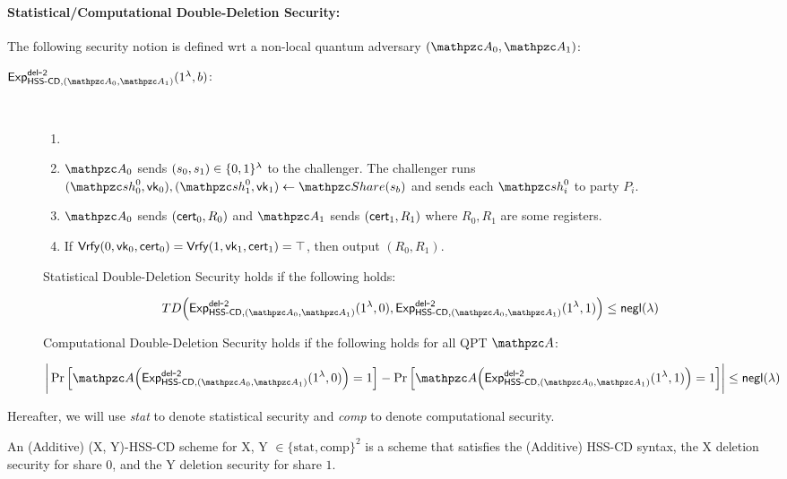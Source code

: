\paragraph{Statistical/Computational Double-Deletion Security:}

The following security notion is defined wrt a non-local quantum
adversary $(\qA_0, \qA_1)$:

\begin{description}
\item [$\expb{\HSScd, (\qA_0, \qA_1)}{del}{2}(1^\secp, b)$:] $ $
\begin{enumerate}
\item 
\item $\qA_0$ sends $(s_0, s_1) \in \{0,1\}^\lambda$ to the challenger.
The challenger runs
$(\qsh_0^0, \vk_0), (\qsh_1^0, \vk_1) \gets \Sh(s_b)$ and sends each
$\qsh_i^0$ to party $P_i$.

\item $\qA_0$ sends $(\mathsf{cert}_0, R_0)$ and $\qA_{1}$ sends
$(\mathsf{cert}_{1}, R_{1})$ where $R_0, R_1$ are some registers.
\item If $\mathsf{Vrfy}(0, \mathsf{vk}_0, \mathsf{cert}_0) = \mathsf{Vrfy}(1, \mathsf{vk}_1, \mathsf{cert}_1)=
\top$, then output $(R_0, R_1)$.
\end{enumerate}

Statistical Double-Deletion Security holds if the following holds:

$$TD\Big(\expb{\HSScd, (\qA_0, \qA_1)}{del}{2}(1^\secp, 
0), \expb{\HSScd, (\qA_0, \qA_1)}{del}{2}(1^\secp,
1)\Big) \le \negl(\secp)$$

Computational Double-Deletion Security holds if the following holds
for all QPT $\qA$:

$$\bigg\lvert \Pr\Big[\qA\Big(\expb{\HSScd, (\qA_0,
\qA_1)}{del}{2}(1^\secp, 0)\Big)=1\Big] -
\Pr\Big[\qA\Big(\expb{\HSScd, (\qA_0,
\qA_1)}{del}{2}(1^\secp, 1)\Big)=1\Big]
\bigg\rvert \le \negl(\secp)$$

\end{description}

Hereafter, we will use \emph{stat} to denote statistical
security and \emph{comp} to denote computational security.

\begin{definition}
An (Additive) (X, Y)-HSS-CD scheme for X, Y $\in \{\textrm{stat},
\textrm{comp}\}^2$  is a scheme that satisfies the (Additive) HSS-CD
syntax, the X deletion security for share $0$, and the Y deletion
security for share $1$.
\end{definition}

